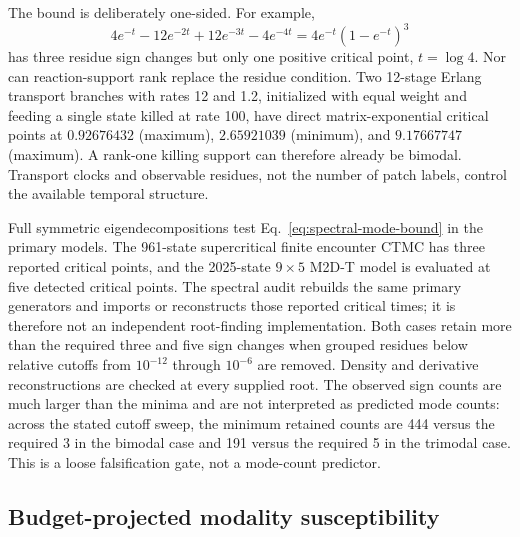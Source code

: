 \documentclass[aps,pre,reprint,amsmath,amssymb,longbibliography,floatfix]{revtex4-2}
\begin{document}
The bound is deliberately one-sided. For example,
\begin{equation}
4e^{-t}-12e^{-2t}+12e^{-3t}-4e^{-4t}
=4e^{-t}(1-e^{-t})^3
\label{eq:spectral-nonsufficient}
\end{equation}
has three residue sign changes but only one positive critical point,
\(t=\log4\). Nor can reaction-support rank replace the residue condition. Two
12-stage Erlang transport branches with rates 12 and 1.2, initialized with
equal weight and feeding a single state killed at rate 100, have direct
matrix-exponential critical points at \(0.92676432\) (maximum), \(2.65921039\)
(minimum), and \(9.17667747\) (maximum). A rank-one killing support can
therefore already be bimodal. Transport clocks and observable residues, not
the number of patch labels, control the available temporal structure.

Full symmetric eigendecompositions test Eq.~\eqref{eq:spectral-mode-bound} in
the primary models. The 961-state supercritical finite encounter CTMC has
three reported critical points, and the 2025-state \(9\times5\) M2D-T
model is evaluated at five detected critical points. The spectral
audit rebuilds the same primary generators and imports or reconstructs
those reported critical times; it is therefore not an independent
root-finding implementation. Both cases retain more than the
required three and five sign changes when grouped residues below relative
cutoffs from \(10^{-12}\) through \(10^{-6}\) are removed. Density and
derivative reconstructions are checked at every supplied root. The observed
sign counts are much larger than the minima and are not interpreted as
predicted mode counts: across the stated cutoff sweep, the minimum retained
counts are 444 versus the required 3 in the bimodal case and 191 versus the
required 5 in the trimodal case. This is a loose falsification gate, not a
mode-count predictor.

\subsection{Budget-projected modality susceptibility}
\label{sec:budget-gradient}
\end{document}
